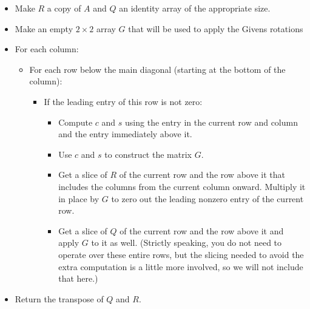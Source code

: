 \begin{itemize}[$\bullet$]

\item Make $R$ a copy of $A$ and $Q$ an identity array of the appropriate size.

\item Make an empty $2 \times 2$ array $G$ that will be used to apply the Givens rotations

\item For each column:

  \begin{itemize}[$\bullet$]

  \item For each row below the main diagonal (starting at the bottom of the column):

    \begin{itemize}[$\bullet$]

    \item If the leading entry of this row is not zero:

      \begin{itemize}[$\bullet$]

      \item Compute $c$ and $s$ using the entry in the current row and column and the entry immediately above it.

      \item Use $c$ and $s$ to construct the matrix $G$.

      \item Get a slice of $R$ of the current row and the row above it that includes the columns from the current column onward.
      Multiply it in place by $G$ to zero out the leading nonzero entry of the current row.

      \item Get a slice of $Q$ of the current row and the row above it and apply $G$ to it as well. (Strictly speaking, you do not need to operate over these entire rows, but the slicing needed to avoid the extra computation is a little more involved, so we will not include that here.)

      \end{itemize}

    \end{itemize}

  \end{itemize}

\item Return the transpose of $Q$ and $R$.

\end{itemize}

